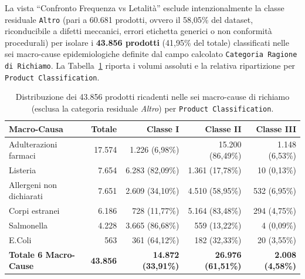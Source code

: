 La vista ``Confronto Frequenza vs Letalità'' esclude intenzionalmente la classe residuale \texttt{Altro} (pari a 60.681 prodotti, ovvero il 58,05\% del dataset, riconducibile a difetti meccanici, errori etichetta generici o non conformità procedurali) per isolare i \textbf{43.856 prodotti} (41,95\% del totale) classificati nelle sei macro-cause epidemiologiche definite dal campo calcolato \texttt{Categoria Ragione di Richiamo}. La Tabella~\ref{tab:tableau_causes_lethality} riporta i volumi assoluti e la relativa ripartizione per \texttt{Product Classification}.

\begin{table}[htbp]
\centering
\caption{Distribuzione dei 43.856 prodotti ricadenti nelle sei macro-cause di richiamo (esclusa la categoria residuale \textit{Altro}) per \texttt{Product Classification}.}
\label{tab:tableau_causes_lethality}
\begin{tabularx}{\textwidth}{@{}Xrrrr@{}}
\toprule
\textbf{Macro-Causa} & \textbf{Totale} & \textbf{Classe I} & \textbf{Classe II} & \textbf{Classe III} \\
\midrule
Adulterazioni farmaci & 17.574 & 1.226 (6,98\%) & 15.200 (86,49\%) & 1.148 (6,53\%) \\
Listeria & 7.654 & 6.283 (82,09\%) & 1.361 (17,78\%) & 10 (0,13\%) \\
Allergeni non dichiarati & 7.651 & 2.609 (34,10\%) & 4.510 (58,95\%) & 532 (6,95\%) \\
Corpi estranei & 6.186 & 728 (11,77\%) & 5.164 (83,48\%) & 294 (4,75\%) \\
Salmonella & 4.228 & 3.665 (86,68\%) & 559 (13,22\%) & 4 (0,09\%) \\
E.Coli & 563 & 361 (64,12\%) & 182 (32,33\%) & 20 (3,55\%) \\
\midrule
\textbf{Totale 6 Macro-Cause} & \textbf{43.856} & \textbf{14.872 (33,91\%)} & \textbf{26.976 (61,51\%)} & \textbf{2.008 (4,58\%)} \\
\bottomrule
\end{tabularx}
\end{table}

